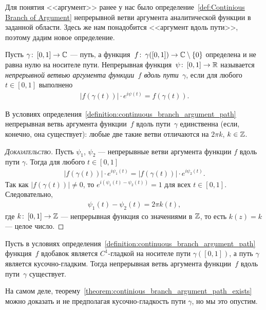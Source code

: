 \documentclass[../complex-analysis.tex]{subfiles}
\begin{document}
Для понятия <<аргумент>> ранее у нас было определение~\ref{def:Continious Branch of Argument} непрерывной ветви аргумента аналитической функции в заданной области. Здесь же нам понадобится <<аргумент вдоль пути>>, поэтому дадим новое определение.

\begin{df}
 \label{definition:continuous_branch_argument_path}
 Пусть $ \gamma\colon\,[0,1]\to\mathbb{C} $ --- путь, а функция~$ f \colon\,\gamma([0,1]) \to \mathbb{C} \setminus \left\{ 0 \right\}$ определена и не равна нулю на носителе пути. Непрерывная функция~$ \psi\colon\,[0,1] \to \mathbb{R} $ называется \emph{непрерывной ветвью аргумента функции~$ f $ вдоль пути~$ \gamma $}, если для любого $ t\in[0,1] $ выполнено
 \begin{align*}
  \left| f(\gamma(t)) \right| \cdot e^{i\psi(t)} = f(\gamma(t)).
 \end{align*}
\end{df}

\begin{claim}
 \label{claim:Argument Along Path Uniqueness}
 В условиях определения~\ref{definition:continuous_branch_argument_path} непрерывная ветвь аргумента функции~$ f $ вдоль пути~$ \gamma $ единственна (если, конечно, она существует): любые две такие ветви отличаются на $ 2\pi k $, $ k\in\mathbb{Z} $.
\end{claim}
\begin{proof}[\normalfont\textsc{Доказательство}]
 Пусть $ \psi_1 $, $ \psi_2 $ --- непрерывные ветви аргумента функции $ f $ вдоль пути $ \gamma $. Тогда для любого $ t\in[0,1] $
 \begin{align*}
  \left| f(\gamma(t)) \right| \cdot e^{i\psi_1(t)} = \left| f(\gamma(t)) \right|\cdot e^{i\psi_2(t)}.
 \end{align*} Так как $ \left| f(\gamma(t)) \right| \neq 0 $, то $ e^{i(\psi_1(t)-\psi_2(t))} = 1 $ для всех $ t\in[0,1] $. Следовательно,
 \begin{align*}
  \psi_1(t) - \psi_2(t) = 2\pi k(t),
 \end{align*} где $ k \colon\,[0,1] \to \mathbb{Z} $ --- непрерывная функция со значениями в $ \mathbb{Z} $, то есть $ k(z) = k $ --- целое число.
\end{proof}

\begin{thm}
 \label{theorem:continious_branch_argument_path_exists}
 Пусть в условиях определения~\ref{definition:continuous_branch_argument_path}  функция~$ f $ вдобавок является $ C^{1} $-гладкой на носителе пути $ \gamma([0,1]) $, а путь $ \gamma $ является кусочно-гладким. Тогда непрерывная ветвь аргумента функции~$ f $ вдоль пути~$ \gamma $ существует.
\end{thm}
На самом деле, теорему~\ref{theorem:continious_branch_argument_path_exists} можно доказать и не предполагая кусочно-гладкость пути $ \gamma $, но мы это опустим.
\end{document}
